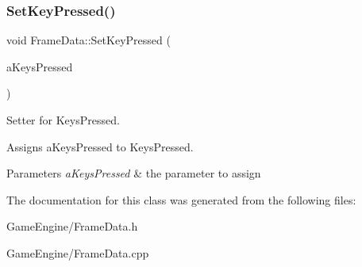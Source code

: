 \subsubsection{SetKeyPressed()}
{\footnotesize\ttfamily void Frame\+Data\+::\+Set\+Key\+Pressed (\begin{DoxyParamCaption}\item[{shared\+\_\+ptr$<$ unordered\+\_\+set$<$ S\+D\+L\+\_\+\+Keycode $>$$>$}]{a\+Keys\+Pressed }\end{DoxyParamCaption})}



Setter for Keys\+Pressed. 

Assigns a\+Keys\+Pressed to Keys\+Pressed. 
\begin{DoxyParams}{Parameters}
{\em a\+Keys\+Pressed} & the parameter to assign \\
\hline
\end{DoxyParams}


The documentation for this class was generated from the following files\+:\begin{DoxyCompactItemize}
\item 
Game\+Engine/Frame\+Data.\+h\item 
Game\+Engine/Frame\+Data.\+cpp\end{DoxyCompactItemize}
